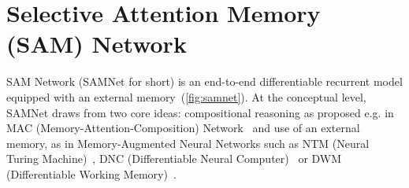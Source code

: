 \section{Selective Attention Memory (SAM) Network}




SAM Network (SAMNet for short) is an end-to-end differentiable recurrent model equipped with an external memory~(\cref{fig:samnet}). At the conceptual level, SAMNet draws from two core ideas:
compositional reasoning as proposed e.g. in MAC (Memory-Attention-Composition) Network~\cite{hudson2018compositional,marois2018transfer} and use of an external memory, as in Memory-Augmented Neural Networks such as NTM (Neural Turing Machine)~\cite{graves2014neural}, DNC (Differentiable Neural Computer)~\cite{graves2016hybrid} or DWM (Differentiable Working Memory)~\cite{jayram2018learning}.

